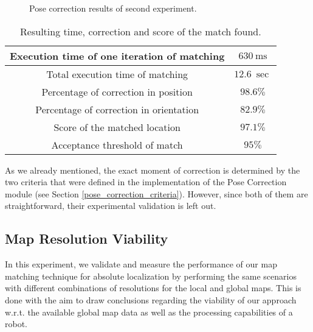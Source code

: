 \begin{figure}[h!]
    \centering
    \setlength\figureheight{8cm}
    \setlength\figurewidth{12cm}
    
    \caption[Pose correction error over time plot]{
        Pose correction results of second experiment.
    }
    \label{fig:pose_correction_error}
\end{figure}

\begin{table}[h!]
    \centering
    \begin{tabular}{| c | c |}
        \hline
        Execution time of one iteration of matching &
            $\SI{630}{\milli\second}$ \\
        \hline
        Total execution time of matching & $\SI{12.6}{\sec}$ \\
        \hline
        \hline
        Percentage of correction in position & $98.6\%$ \\
        \hline
        Percentage of correction in orientation & $82.9\%$ \\
        \hline
        \hline
        Score of the matched location & $97.1\%$ \\
        \hline
        Acceptance threshold of match & $95\%$ \\
        \hline
    \end{tabular}
    \caption[Results of pose correction for absolute localization]{
        Resulting time, correction and score of the match found.
    }
    \label{table:pose_correction}
\end{table}

As we already mentioned, the exact moment of correction is determined by
the two criteria that were defined in the implementation of the Pose Correction
module (see Section \ref{pose_correction_criteria}).
However, since both of them are straightforward, their experimental
validation is left out.

\subsection{Map Resolution Viability}

In this experiment, we validate and measure the performance of our map
matching technique for absolute localization by performing the same
scenarios with different combinations of resolutions for the local and
global maps.
This is done with the aim to draw conclusions regarding the viability
of our approach w.r.t. the available global map data as well as
the processing capabilities of a robot.

